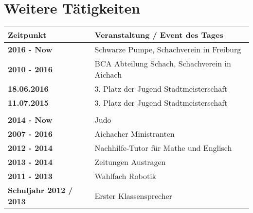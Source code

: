 \documentclass{scrartcl}
\begin{document}
\section*{Weitere Tätigkeiten}
\begin{tabular}[c]{|l|l|}
    \hline
    \textbf{Zeitpunkt} & Veranstaltung / Event des Tages \\ \hline


    \textbf{2016 - Now } & Schwarze Pumpe, Schachverein in Freiburg \\ \hline
    \textbf{2010 - 2016} & BCA Abteilung Schach, Schachverein in Aichach \\ \hline
    \textbf{18.06.2016} & 3. Platz der Jugend Stadtmeisterschaft \\ \hline
    \textbf{11.07.2015} & 3. Platz der Jugend Stadtmeisterschaft \\ \hline

    \\ \hline

    \textbf{2014 - Now } & Judo \\ \hline
    \textbf{2007 - 2016} & Aichacher Ministranten \\ \hline
    \textbf{2012 - 2014} & Nachhilfe-Tutor für Mathe und Englisch \\ \hline
    \textbf{2013 - 2014} & Zeitungen Austragen \\ \hline
    \textbf{2011 - 2013} & Wahlfach Robotik \\ \hline
    \textbf{Schuljahr 2012 / 2013} & Erster Klassensprecher \\ \hline

\end{tabular}
\end{document}
